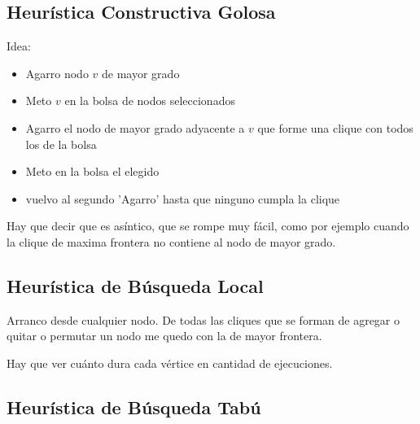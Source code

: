 \subsection{Heurística Constructiva Golosa}
Idea:
\begin{itemize}
\item Agarro nodo $v$ de mayor grado
\item Meto $v$ en la bolsa de nodos seleccionados
\item Agarro el nodo de mayor grado adyacente a $v$ que forme una clique con todos los de la bolsa
\item Meto en la bolsa el elegido
\item vuelvo al segundo 'Agarro' hasta que ninguno cumpla la clique
\end{itemize}


Hay que decir que es asíntico, que se rompe muy fácil, como por ejemplo cuando la clique de maxima frontera no contiene al nodo de mayor grado.

\subsection{Heurística de Búsqueda Local}

Arranco desde cualquier nodo. De todas las cliques que se forman de agregar o quitar o permutar un nodo me quedo con la de mayor frontera.

Hay que ver cuánto dura cada vértice en cantidad de ejecuciones.


\subsection{Heurística de Búsqueda Tabú}